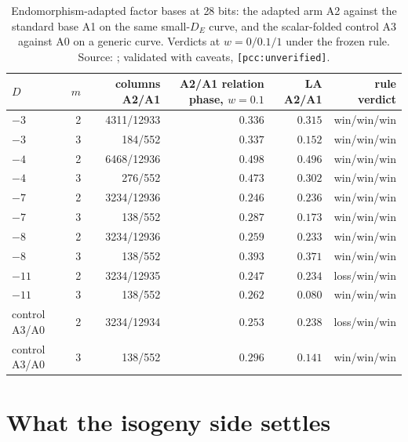 \begin{table}[t]
\centering\footnotesize
\begin{tabular}{@{}lrrrrr@{}}
\toprule
$D$ & $m$ & columns A2/A1 & A2/A1 relation phase, $w=0.1$ & LA A2/A1 & rule verdict \\
\midrule
$-3$ & 2 & 4311/12933 & $0.336$ & $0.315$ & win/win/win \\
$-3$ & 3 & 184/552 & $0.337$ & $0.152$ & win/win/win \\
$-4$ & 2 & 6468/12936 & $0.498$ & $0.496$ & win/win/win \\
$-4$ & 3 & 276/552 & $0.473$ & $0.302$ & win/win/win \\
$-7$ & 2 & 3234/12936 & $0.246$ & $0.236$ & win/win/win \\
$-7$ & 3 & 138/552 & $0.287$ & $0.173$ & win/win/win \\
$-8$ & 2 & 3234/12936 & $0.259$ & $0.233$ & win/win/win \\
$-8$ & 3 & 138/552 & $0.393$ & $0.371$ & win/win/win \\
$-11$ & 2 & 3234/12935 & $0.247$ & $0.234$ & loss/win/win \\
$-11$ & 3 & 138/552 & $0.262$ & $0.080$ & win/win/win \\
\addlinespace
control A3/A0 & 2 & 3234/12934 & $0.253$ & $0.238$ & loss/win/win \\
control A3/A0 & 3 & 138/552 & $0.296$ & $0.141$ & win/win/win \\
\bottomrule
\end{tabular}
\caption[]{Endomorphism-adapted factor bases at 28 bits: the adapted arm A2
against the standard base A1 on the same small-$D_E$ curve, and the
scalar-folded control A3 against A0 on a generic curve. Verdicts at
$w=0/0.1/1$ under the frozen rule. Source:
; validated with
caveats, \texttt{[pcc:unverified]}.}
\label{tab:iso-endo-fb}
\end{table}

\section{What the isogeny side settles}\label{sec:iso-summary}

